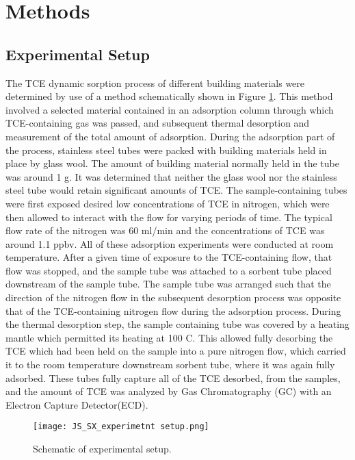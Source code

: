 \section{Methods}\label{sec:methods}


\subsection{Experimental Setup}\label{sec:experiment}

The TCE  dynamic sorption process of different building materials were determined by use of a method schematically shown in Figure \ref{fig:js_sx_setup}.
This method involved a selected material contained in an adsorption column through which TCE-containing gas was passed, and subsequent thermal desorption and measurement of the total amount of adsorption.
During the adsorption part of the process, stainless steel tubes were packed with building materials held in place by glass wool.
The amount of building material normally held in the tube was around 1 g. %
It was determined that neither the glass wool nor the stainless steel tube would retain significant amounts of TCE.
The sample-containing tubes were first exposed desired low concentrations of TCE in nitrogen, which were then allowed to interact with the flow for varying periods of time.
The typical flow rate of the nitrogen was 60 ml/min and the concentrations of TCE was around 1.1 ppbv.
All of these adsorption experiments were conducted at room temperature.
After a given time of exposure to the TCE-containing flow, that flow was stopped, and the sample tube was attached to a sorbent tube placed downstream of the sample tube.
The sample tube was arranged such that the direction of the nitrogen flow in the subsequent desorption process was opposite that of the TCE-containing nitrogen flow during the adsorption process.
During the thermal desorption step, the sample containing tube was covered by a heating mantle which permitted its heating at 100 C. %
This allowed fully desorbing the TCE which had been held on the sample into a pure nitrogen flow, which carried it to the room temperature downstream sorbent tube, where it was again fully adsorbed.
These tubes fully capture all of the TCE desorbed, from the samples, and the amount of TCE was analyzed by Gas Chromatography (GC) with an  Electron Capture Detector(ECD).

\begin{figure}
  \texttt{[image: JS\_SX\_experimetnt setup.png]}
  \caption{Schematic of experimental setup.} %
  \label{fig:js_sx_setup}
\end{figure}

